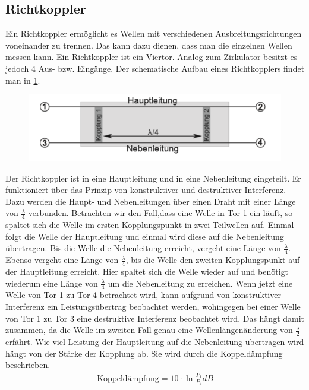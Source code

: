 \subsection{Richtkoppler}
Ein Richtkoppler ermöglicht es Wellen mit verschiedenen Ausbreitungsrichtungen voneinander zu trennen. Das kann dazu dienen, dass man die einzelnen Wellen messen kann. Ein Richtkoppler ist ein Viertor. Analog zum Zirkulator besitzt es jedoch 4 Aus- bzw. Eingänge. Der schematische Aufbau eines Richtkopplers findet man in \cref{RB}. 
\begin{figure}[h!]
	\centering
	\includegraphics[scale = 1]{Richt-Bild.PNG}
	\caption{}
	\label{RB}
\end{figure}
Der Richtkoppler ist in eine Hauptleitung und in eine Nebenleitung eingeteilt. Er funktioniert über das Prinzip von konstruktiver und destruktiver Interferenz. Dazu werden die Haupt- und Nebenleitungen über einen Draht mit  einer Länge von $\frac{\lambda}{4}$ verbunden. Betrachten wir den Fall,dass eine Welle in Tor 1 ein läuft, so spaltet sich die Welle im ersten Kopplungspunkt in zwei Teilwellen auf. Einmal folgt die Welle der Hauptleitung und einmal wird diese auf die Nebenleitung übertragen. Bis die Welle die Nebenleitung erreicht, vergeht eine Länge von $\frac{\lambda}{4}$. Ebenso vergeht eine Länge von $\frac{\lambda}{4}$, bis die Welle den zweiten Kopplungspunkt auf der Hauptleitung erreicht. Hier spaltet sich die Welle wieder auf und benötigt wiederum eine Länge von $\frac{\lambda}{4}$ um die Nebenleitung zu erreichen. Wenn jetzt eine Welle von Tor 1 zu Tor 4 betrachtet wird, kann aufgrund von konstruktiver Interferenz ein Leistungsübertrag beobachtet werden, wohingegen bei einer Welle von Tor 1 zu Tor 3 eine destruktive Interferenz beobachtet wird. Das hängt damit zusammen, da die Welle im zweiten Fall genau eine Wellenlängenänderung von $\frac{\lambda}{2}$ erfährt.
Wie viel Leistung der Hauptleitung auf die Nebenleitung übertragen wird hängt von der Stärke der Kopplung ab. Sie wird durch die Koppeldämpfung beschrieben.
\begin{align}
\text{Koppeldämpfung} = 10\cdot \ln{\frac{P_1}{P_4}}dB
\label{KppF}
\end{align}
